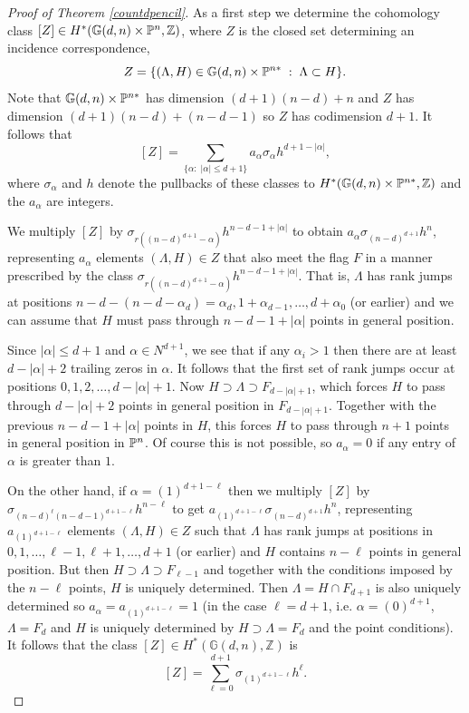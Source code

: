 \documentclass[12pt]{article}
\theoremstyle{plain}
\theoremstyle{definition}
\newcommand{\N}{N}
\newcommand{\Z}{\mathbb{Z}}
\newcommand{\G}{\mathbb{G}}
\renewcommand{\P}{\ensuremath \mathbb{P}}
\begin{document}
\begin{proof}[Proof of Theorem \ref{countdpencil}]
As a first step we determine the
cohomology class $[Z] \in H^*(\G(d,n) \times \P^n, \Z)$, where $Z$ is
the closed set determining an incidence correspondence,
$$ Z = \{(\Lambda, H) \in \G(d,n) \times \P^{n*} \; : \;  \Lambda \subset
H \}.$$ Note that $\G(d,n) \times \P^{n*}$ has dimension $(d+1)(n-d)+n$ and $Z$ has
dimension $(d+1)(n-d)+(n-d-1)$ so $Z$ has codimension $d+1$. It
follows that 
$$[Z] = \sum_{\{\alpha: \; |\alpha| \leq d+1\}} a_\alpha
\sigma_{\alpha} h^{d+1-|\alpha|},$$
where $\sigma_{\alpha}$ and $h$ denote the pullbacks of these classes
to $H^*(\G(d,n) \times \P^{n*}, \Z)$ and the $a_\alpha$ are integers. 

We multiply $[Z]$ by $\sigma_{r((n-d)^{d+1}-\alpha)} h^{n-d-1+|\alpha|}$
to obtain $a_\alpha \sigma_{(n-d)^{d+1}}h^n$, representing $a_\alpha$
elements $(\Lambda,H) \in Z$ that also meet the flag $F$ in a manner
prescribed by the class $\sigma_{r((n-d)^{d+1}-\alpha)}
h^{n-d-1+|\alpha|}$. That is, $\Lambda$ has rank jumps at positions
$n-d-(n-d-\alpha_d) = \alpha_d, 1+\alpha_{d-1}, \ldots, d+\alpha_0$
(or earlier) and we can assume that $H$ must pass through $n-d-1+| 
\alpha | $ points in general position. 

Since $| \alpha | \leq d+1$ and $\alpha \in \N^{d+1}$, we see
that if any $\alpha_i > 1$ then there are at least $d- |  \alpha
|  +2$ trailing zeros in $\alpha$. It follows that the first set of
rank jumps occur at positions $0,1,2, \ldots, d-|  \alpha |  +
1$. Now $H \supset \Lambda \supset F_{d-|  \alpha |  + 1}$, which
forces $H$ to pass through $d-|  \alpha |  + 2$ points in general
position in $F_{d-|  \alpha |  + 1}$. Together with the previous
$n-d-1+|  \alpha | $ points in $H$, this forces $H$ to pass
through $n+1$ points in general position in $\P^n$. Of course this is
not possible, so $a_\alpha = 0$ if any entry of $\alpha$ is greater
than $1$.

On the other hand, if $\alpha = (1)^{d+1-\ell}$ then we multiply $[Z]$ by 
$\sigma_{(n-d)^{\ell}(n-d-1)^{d+1-\ell}} h^{n-\ell}$ to get $a_{(1)^{d+1-\ell}}
  \sigma_{(n-d)^{d+1}}h^n$, representing $a_{(1)^{d+1-\ell}}$ elements
    $(\Lambda,H)\in Z$ such that $\Lambda$ has rank jumps at positions
    in $0, 1, \ldots, \ell-1, \ell+1, \ldots, d+1$ (or earlier) and $H$
    contains $n-\ell$ points in general position. But then $H \supset
    \Lambda \supset F_{\ell-1}$ and together with the conditions imposed
    by the $n-\ell$ points, $H$ is uniquely determined. Then $\Lambda = H
    \cap F_{d+1}$ is also uniquely determined so $a_\alpha =
    a_{(1)^{d+1-\ell}}=1$ (in the case $\ell=d+1$, i.e. $\alpha = (0)^{d+1}$,
    $\Lambda = F_d$ and $H$ is uniquely determined by $H \supset
    \Lambda = F_d$ and the point conditions). It follows that the
    class $[Z] \in H^*(\G(d,n),\Z)$ is 
$$[Z] = \sum_{\ell=0}^{d+1} \sigma_{(1)^{d+1-\ell}} h^{\ell}. $$


\end{proof}
\end{document}
